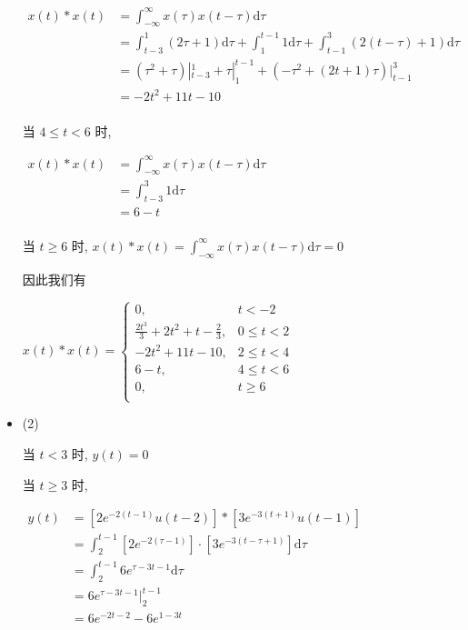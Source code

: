 \documentclass[a4paper,UTF8]{article}
\numberwithin{equation}{section}
\begin{document}
\begin{framed}
\begin{spacing}{1.5}
\begin{itemize}
      $
      \begin{aligned}
      x(t) * x(t) &= \int_{-\infty}^{\infty}x(\tau)x(t-\tau)\mathrm{d}\tau  \\
      &= \int_{t-3}^{1}(2\tau+1)\mathrm{d}\tau + \int_{1}^{t-1}1\mathrm{d}\tau + \int_{t-1}^{3}(2(t-\tau)+1)\mathrm{d}\tau  \\
      &= (\tau^{2}+\tau)|_{t-3}^{1} + \tau|_{1}^{t-1} + (-\tau^{2} + (2 t+1)\tau)|_{t-1}^{3}  \\
      &= - 2 t^{2} + 11 t - 10  \\
      \end{aligned}
      $
      
      当 $4 \le t < 6$ 时,
      
      $
      \begin{aligned}
      x(t) * x(t) &= \int_{-\infty}^{\infty}x(\tau)x(t-\tau)\mathrm{d}\tau  \\
      &= \int_{t-3}^{3}1\mathrm{d}\tau  \\
      &= 6 - t  \\
      \end{aligned}
      $
      
      当 $t \ge 6$ 时, $\displaystyle x(t) * x(t) = \int_{-\infty}^{\infty}x(\tau)x(t-\tau)\mathrm{d}\tau = 0$
      
      因此我们有
      
      $x(t) * x(t) = \begin{cases}
          0, & t < -2 \\
          \frac{2 t^{3}}{3} + 2 t^{2} + t - \frac{2}{3}, & 0 \le t < 2 \\
          - 2 t^{2} + 11 t - 10, & 2 \le t < 4 \\
          6 - t, & 4 \le t < 6 \\
          0, & t \ge 6 \\
      \end{cases}$
      
      \item (2)
      
      当 $t < 3$ 时, $y(t) = 0$
      
      当 $t \ge 3$ 时,
      
      $
      \begin{aligned}
      y(t) &= [2e^{-2(t-1)}u(t-2)] * [3e^{-3(t+1)}u(t-1)] \\
      &= \int_{2}^{t-1}[2e^{-2(\tau-1)}]\cdot [3e^{-3(t-\tau+1)}]\mathrm{d}\tau \\
      &= \int_{2}^{t-1}6 e^{\tau - 3 t  - 1}\mathrm{d}\tau \\
      &= 6 e^{\tau - 3 t  - 1}|_{2}^{t-1} \\
      &= 6 e^{- 2 t - 2} - 6 e^{1 - 3 t} \\
      \end{aligned}
      $
      

\end{itemize}
\end{spacing}
\end{framed}
\end{document}
